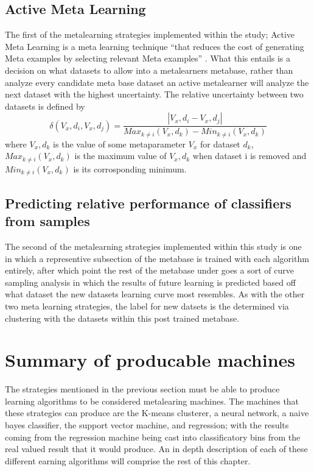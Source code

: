 \subsection{Active Meta Learning}
The first of the metalearning strategies implemented within the study; Active
Meta Learning is a meta learning technique  ``that reduces the cost of generating Meta examples
by selecting relevant Meta examples'' \cite{Bhatt}. What this entails is a decision on what
datasets to allow into a metalearners metabase, rather than analyze every candidate meta base dataset
an active metalearner will analyze the next dataset with the highest uncertainty. The relative uncertainty
between two datasets is defined by
$$\delta(V_x,d_i,V_x,d_j) = \frac{|V_x,d_i - V_x,d_j|}{Max_{k\neq i}(V_x,d_k)- Min_{k\neq i}(V_x,d_k)}$$
where $V_x,d_k$ is the value of some metaparameter $V_x$ for dataset $d_k$,
$Max_{k\neq i}(V_x,d_k)$ is the maximum value of $V_x,d_k$ when dataset i is removed and
$Min_{k\neq i}(V_x,d_k)$ is its corrosponding minimum.
\subsection{Predicting relative performance of classifiers from samples}
The second of the metalearning strategies implemented within this study is one in which
a representive subsection of the metabase is trained with each algorithm entirely, after
which point the rest of the metabase under goes a sort of curve sampling analysis in which
the results of future learning is predicted based off what dataset the new datasets learning
curve most resembles. \cite{Leite} As with the other two meta learning strategies, the label
for new datsets is the determined via clustering with the datasets within this post trained
metabase.

\section{Summary of producable machines}
The strategies mentioned in the previous section must be able to produce learning algorithms
to be considered metalearing machines. The machines that these strategies can produce are
the K-means clusterer, a neural network, a naive bayes classifier, the support vector machine,
and regression; with the results coming from the regression machine being cast into
classificatory bins from the real valued result that it would produce. An in depth
description of each of these different earning algorithms will comprise the rest of
this chapter.
